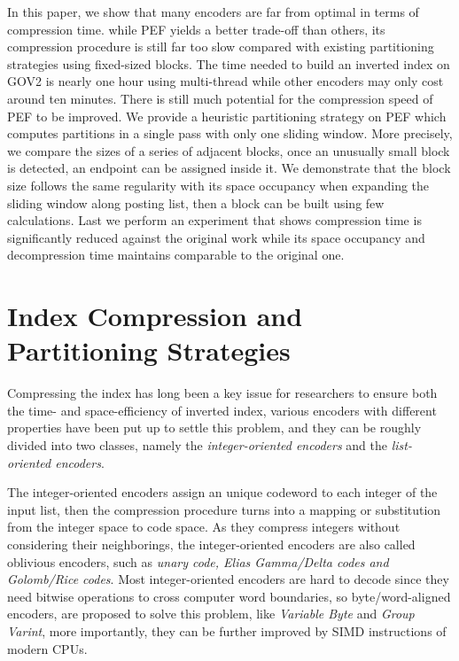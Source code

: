 \documentclass[runningheads,a4paper]{llncs}
\begin{document}
In this paper, we show that many encoders are far from optimal in terms of compression time.
while PEF yields a better trade-off than others, its compression procedure is still far too slow compared with existing partitioning strategies using fixed-sized blocks.
The time needed to build an inverted index on GOV2 is nearly one hour using multi-thread while other encoders may only cost around ten minutes.
There is still much potential for the compression speed of PEF to be improved.
We provide a heuristic partitioning strategy on PEF which computes partitions in a single pass with only one sliding window.
More precisely, we compare the sizes of a series of adjacent blocks, once an unusually small block is detected, an endpoint can be assigned inside it.
We demonstrate that the block size follows the same regularity with its space occupancy when expanding the sliding window along posting list, then a block can be built using few calculations.
{\color{red}{say something about the collection, gov2 and common crawl.}}
Last we perform an experiment that shows compression time is significantly reduced against the original work while its space occupancy and decompression time maintains comparable to the original one.

\section{Index Compression and Partitioning Strategies}\label{sec:II}

Compressing the index has long been a key issue for researchers to ensure both the time- and space-efficiency of inverted index, various encoders with different properties have been put up to settle this problem, and they can be roughly divided into two classes, namely the \textit{integer-oriented encoders} and the \textit{list-oriented encoders}.

The integer-oriented encoders assign an unique codeword to each integer of the input list, then the compression procedure turns into a mapping or substitution from the integer space to code space.
As they compress integers without considering their neighborings, the integer-oriented encoders are also called oblivious encoders\cite{catena2014inverted}, such as \textit{unary code, Elias Gamma/Delta codes \emph{and} Golomb/Rice codes}.
Most integer-oriented encoders are hard to decode since they need bitwise operations to cross computer word boundaries, so byte/word-aligned encoders, are proposed to solve this problem, like \textit{Variable Byte} and \textit{Group Varint}, more importantly, they can be further improved by SIMD instructions of modern CPUs\cite{stepanov2011simd,trotman2014compression}.
\end{document}
